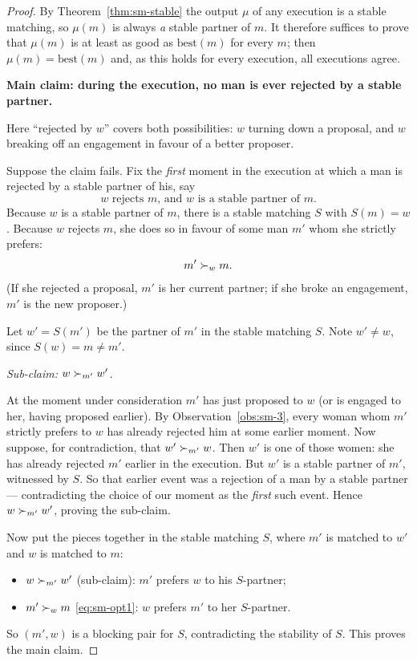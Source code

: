\begin{proof}
By Theorem~\ref{thm:sm-stable} the output $\mu$ of any execution is a stable
matching, so $\mu(m)$ is always \emph{a} stable partner of $m$. It therefore
suffices to prove that $\mu(m)$ is at least as good as $\mathrm{best}(m)$ for
every $m$; then $\mu(m) = \mathrm{best}(m)$ and, as this holds for every
execution, all executions agree.

\medskip
\noindent\textbf{Main claim: during the execution, no man is ever rejected by
a stable partner.}

Here ``rejected by $w$'' covers both possibilities: $w$ turning down a
proposal, and $w$ breaking off an engagement in favour of a better proposer.

Suppose the claim fails. Fix the \emph{first} moment in the execution at which
a man is rejected by a stable partner of his, say
\[
  \text{$w$ rejects $m$, and $w$ is a stable partner of $m$.}
\]
Because $w$ is a stable partner of $m$, there is a stable matching $S$ with
$S(m) = w$. Because $w$ rejects $m$, she does so in favour of some man $m'$
whom she strictly prefers:
\begin{equation}\label{eq:sm-opt1}
  m' \succ_{w} m .
\end{equation}
(If she rejected a proposal, $m'$ is her current partner; if she broke an
engagement, $m'$ is the new proposer.)

Let $w' = S(m')$ be the partner of $m'$ in the stable matching $S$. Note
$w' \neq w$, since $S(w) = m \neq m'$.

\medskip
\noindent\emph{Sub-claim: $w \succ_{m'} w'$.}

At the moment under consideration $m'$ has just proposed to $w$ (or is engaged
to her, having proposed earlier). By Observation~\ref{obs:sm-3}, every woman whom
$m'$ strictly prefers to $w$ has already rejected him at some earlier moment.
Now suppose, for contradiction, that $w' \succ_{m'} w$. Then $w'$ is one of those
women: she has already rejected $m'$ earlier in the execution. But $w'$ is a
stable partner of $m'$, witnessed by $S$. So that earlier event was a rejection
of a man by a stable partner --- contradicting the choice of our moment as the
\emph{first} such event. Hence $w \succ_{m'} w'$, proving the sub-claim.

\medskip
Now put the pieces together in the stable matching $S$, where $m'$ is matched
to $w'$ and $w$ is matched to $m$:
\begin{itemize}[nosep]
  \item $w \succ_{m'} w'$ \quad (sub-claim): $m'$ prefers $w$ to his $S$-partner;
  \item $m' \succ_{w} m$ \quad \eqref{eq:sm-opt1}: $w$ prefers $m'$ to her
        $S$-partner.
\end{itemize}
So $(m', w)$ is a blocking pair for $S$, contradicting the stability of $S$.
This proves the main claim.


\end{proof}
